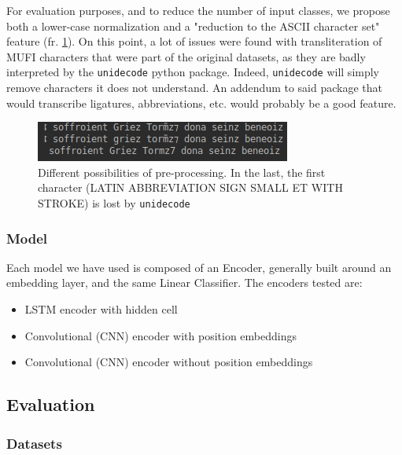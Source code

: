 \documentclass{jdmdh}
\begin{document}
For evaluation purposes, and to reduce the number of input classes, we propose both a lower-case normalization and a "reduction to the ASCII character set" feature (fr. \ref{fig:normalization}). On this point, a lot of issues were found with transliteration of MUFI characters that were part of the original datasets, as they are badly interpreted by the \texttt{unidecode} python package. Indeed, \texttt{unidecode} will simply remove characters it does not understand. An addendum to said package that would transcribe ligatures, abbreviations, etc. would probably be a good feature.

\begin{figure}
  \centering
  \includegraphics[width=\linewidth]{inputs.png}
  \caption{ Different possibilities of pre-processing. In the last, the first character (LATIN ABBREVIATION SIGN SMALL ET WITH STROKE) is lost by \texttt{unidecode}}
  \label{fig:normalization}
\end{figure}

\subsubsection{Model}

Each model we have used is composed of an Encoder, generally built around an embedding layer, and the same Linear Classifier. The encoders tested are:

\begin{itemize}
  \item LSTM encoder with hidden cell
  \item Convolutional (CNN) encoder with position embeddings 
  \item Convolutional (CNN) encoder without position embeddings %
\end{itemize}

\subsection{Evaluation}

\subsubsection{Datasets}
\end{document}

